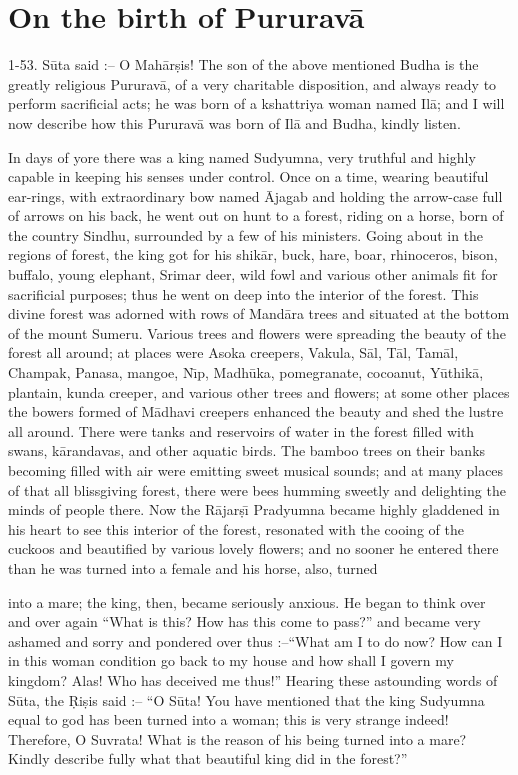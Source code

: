 \chapter{On the birth of Pururav\=a}

1-53. S\=uta said :-- O Mah\=ar\d{s}is! The son of the above mentioned Budha is the greatly religious Pururav\=a, of a very charitable disposition, and always ready to perform sacrificial acts; he was born of a kshattriya woman named Il\=a; and I will now describe how this Pururav\=a was born of Il\=a and Budha, kindly listen.

In days of yore there was a king named Sudyumna, very truthful and highly capable in keeping his senses under control. Once on a time, wearing beautiful ear-rings, with extraordinary bow named \=Ajagab and holding the arrow-case full of arrows on his back, he went out on hunt to a forest, riding on a horse, born of the country Sindhu, surrounded by a few of his ministers. Going about in the regions of forest, the king got for his shik\=ar, buck, hare, boar, rhinoceros, bison, buffalo, young elephant, Srimar deer, wild fowl and various other animals fit for sacrificial purposes; thus he went on deep into the interior of the forest. This divine forest was adorned with rows of Mand\=ara trees and situated at the bottom of the mount Sumeru. Various trees and flowers were spreading the beauty of the forest all around; at places were Asoka creepers, Vakula, S\=al, T\=al, Tam\=al, Champak, Panasa, mangoe, N\={\i}p, Madh\=uka, pomegranate, cocoanut, Y\=uthik\=a, plantain, kunda creeper, and various other trees and flowers; at some other places the bowers formed of M\=adhavi creepers enhanced the beauty and shed the lustre all around. There were tanks and reservoirs of water in the forest filled with swans, k\=arandavas, and other aquatic birds. The bamboo trees on their banks becoming filled with air were emitting sweet musical sounds; and at many places of that all blissgiving forest, there were bees humming sweetly and delighting the minds of people there. Now the R\=ajar\d{s}\={\i} Pradyumna became highly gladdened in his heart to see this interior of the forest, resonated with the cooing of the cuckoos and beautified by various lovely flowers; and no sooner he entered there than he was turned into a female and his horse, also, turned

into a mare; the king, then, became seriously anxious. He began to think over and over again ``What is this? How has this come to pass?'' and became very ashamed and sorry and pondered over thus :--``What am I to do now? How can I in this woman condition go back to my house and how shall I govern my kingdom? Alas! Who has deceived me thus!'' Hearing these astounding words of S\=uta, the \d{R}i\d{s}is said :-- ``O S\=uta! You have mentioned that the king Sudyumna equal to god has been turned into a woman; this is very strange indeed! Therefore, O Suvrata! What is the reason of his being turned into a mare? Kindly describe fully what that beautiful king did in the forest?''

